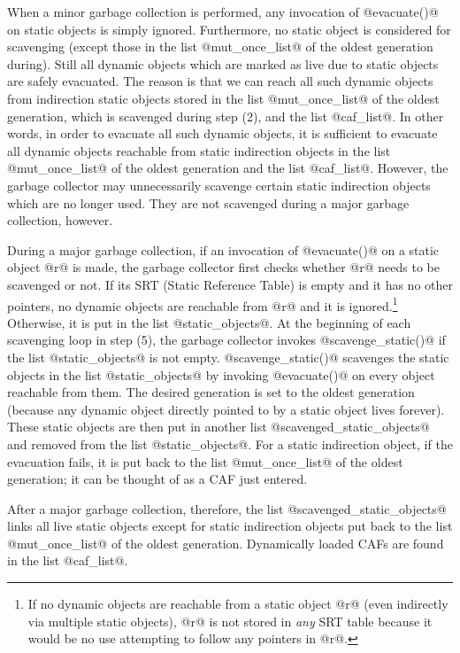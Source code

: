 \documentclass{article}
\begin{document}
When a minor garbage collection is performed, any invocation of
@evacuate()@ on static objects is simply ignored. 
Furthermore, no static object is considered for scavenging
(except those in the list @mut_once_list@ of the oldest generation during).
Still all dynamic objects which are marked as live due to static objects
are safely evacuated.
The reason is that we can reach all such dynamic objects from 
indirection static objects stored in the list 
@mut_once_list@ of the oldest generation, which is scavenged during step (2),
and the list @caf_list@.
In other words, in order to evacuate all such dynamic objects, it is 
sufficient to evacuate all dynamic objects reachable from 
static indirection objects in 
the list @mut_once_list@ of the oldest generation and the list @caf_list@.
However, the garbage collector may unnecessarily scavenge certain static 
indirection objects which are no longer used.
They are not scavenged during a major garbage collection, however.

During a major garbage collection,
if an invocation of @evacuate()@ on a static object @r@ is made,
the garbage collector first checks whether @r@ needs to be scavenged or not.
If its SRT (Static Reference Table) is empty and it has no other pointers, 
no dynamic objects are reachable from @r@ and it is ignored.\footnote{If 
no dynamic objects are reachable from a static object @r@ (even indirectly
via multiple static objects),
@r@ is not stored in \emph{any} SRT table because it would be no use attempting
to follow any pointers in @r@.}
Otherwise, it is put in the list @static_objects@.
At the beginning of each scavenging loop in step (5), 
the garbage collector invokes @scavenge_static()@ if the list @static_objects@
is not empty.
@scavenge_static()@ scavenges the static objects in the list @static_objects@
by invoking @evacuate()@ on every object reachable from them.
The desired generation is set to the oldest generation (because any
dynamic object directly pointed to by a static object lives 
forever).
These static objects are then put in another list @scavenged_static_objects@
and removed from the list @static_objects@.
For a static indirection object, if the evacuation 
fails, it is put back to the list @mut_once_list@ of the oldest generation;
it can be thought of as a CAF just entered.

After a major garbage collection, therefore, the list @scavenged_static_objects@
links all live static objects except for static indirection objects put back
to the list @mut_once_list@ of the oldest generation. 
Dynamically loaded CAFs are found in the list @caf_list@.
\end{document}
